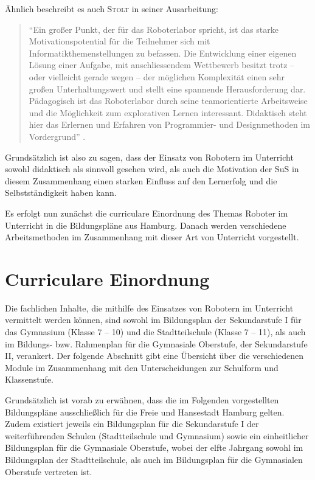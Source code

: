 \documentclass[paper=a4, DIV=calc, BCOR=12mm, twoside=on, onecolumn=on, open = right, titlepage =on, parskip =half-, headsepline = on, footsepline = off, chapterprefix = off, appendixprefix = on, fontsize = 12pt, numbers = noenddot, abstract = on]{scrbook}
\begin{document}
Ähnlich beschreibt es auch \textsc{Stolt} in seiner Ausarbeitung:
\begin{quote}
"`Ein großer Punkt, der für das Roboterlabor spricht, ist das starke Motivationspotential für die Teilnehmer sich mit Informatikthemenstellungen zu befassen. Die Entwicklung einer eigenen Lösung einer Aufgabe, mit anschliessendem Wettbewerb besitzt trotz – oder vielleicht gerade wegen – der möglichen Komplexität einen sehr großen Unterhaltungswert und stellt eine spannende Herausforderung dar. Pädagogisch ist das Roboterlabor durch seine teamorientierte Arbeitsweise und die Möglichkeit zum explorativen Lernen interessant. Didaktisch steht hier das Erlernen und Erfahren von Programmier- und Designmethoden im Vordergrund"' \cite[S.5f.]{stolt:01}.
\end{quote}

Grundsätzlich ist also zu sagen, dass der Einsatz von Robotern im Unterricht sowohl didaktisch als sinnvoll gesehen wird, als auch die Motivation der SuS in diesem Zusammenhang einen starken Einfluss auf den Lernerfolg und die Selbstständigkeit haben kann. 

Es erfolgt nun zunächst die curriculare Einordnung des Themas Roboter im Unterricht in die Bildungspläne aus Hamburg. Danach werden verschiedene Arbeitsmethoden im Zusammenhang mit dieser Art von Unterricht vorgestellt.
\clearpage

\section{Curriculare Einordnung}
Die fachlichen Inhalte, die mithilfe des Einsatzes von Robotern im Unterricht vermittelt werden können, sind sowohl im Bildungsplan der Sekundarstufe I für das Gymnasium (Klasse 7 -- 10) und die Stadtteilschule (Klasse 7 -- 11), als auch im Bildungs- bzw. Rahmenplan für die Gymnasiale Oberstufe, der Sekundarstufe II, verankert. Der folgende Abschnitt gibt eine Übersicht über die verschiedenen Module im Zusammenhang mit den Unterscheidungen zur Schulform und Klassenstufe.

Grundsätzlich ist vorab zu erwähnen, dass die im Folgenden vorgestellten Bildungspläne ausschließlich für die Freie und Hansestadt Hamburg gelten. Zudem existiert jeweils ein Bildungsplan für die Sekundarstufe I der weiterführenden Schulen (Stadtteilschule und Gymnasium) sowie ein einheitlicher Bildungsplan für die Gymnasiale Oberstufe, wobei der elfte Jahrgang sowohl im Bildungsplan der Stadtteilschule, als auch im Bildungsplan für die Gymnasialen Oberstufe vertreten ist. 
\end{document}

